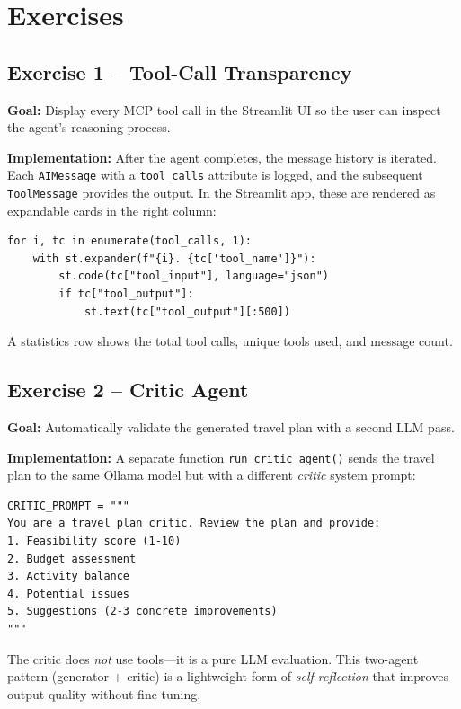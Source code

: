 \documentclass[12pt,a4paper]{article}
\begin{document}
\section{Exercises}

\subsection{Exercise 1 – Tool-Call Transparency}

\textbf{Goal:} Display every MCP tool call in the Streamlit UI so the user
can inspect the agent's reasoning process.

\textbf{Implementation:} After the agent completes, the message history is
iterated.  Each \texttt{AIMessage} with a \texttt{tool\_calls} attribute is
logged, and the subsequent \texttt{ToolMessage} provides the output.  In the
Streamlit app, these are rendered as expandable cards in the right column:

\begin{lstlisting}
for i, tc in enumerate(tool_calls, 1):
    with st.expander(f"{i}. {tc['tool_name']}"):
        st.code(tc["tool_input"], language="json")
        if tc["tool_output"]:
            st.text(tc["tool_output"][:500])
\end{lstlisting}

A statistics row shows the total tool calls, unique tools used, and message
count.

\subsection{Exercise 2 – Critic Agent}

\textbf{Goal:} Automatically validate the generated travel plan with a second
LLM pass.

\textbf{Implementation:} A separate function \texttt{run\_critic\_agent()}
sends the travel plan to the same Ollama model but with a different
\emph{critic} system prompt:

\begin{lstlisting}
CRITIC_PROMPT = """
You are a travel plan critic. Review the plan and provide:
1. Feasibility score (1-10)
2. Budget assessment
3. Activity balance
4. Potential issues
5. Suggestions (2-3 concrete improvements)
"""
\end{lstlisting}

The critic does \emph{not} use tools—it is a pure LLM evaluation.  This
two-agent pattern (generator + critic) is a lightweight form of
\emph{self-reflection} that improves output quality without fine-tuning.
\end{document}
